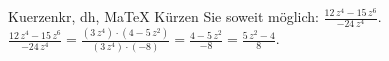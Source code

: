 \begin{MAufgabe}{Kuerzen}{kr, dh, MaTeX}
K\"urzen Sie soweit m\"oglich: $\frac{12\, z^4 - 15\, z^6}{- 24\, z^4}$.\\ 
\ifLsg\MLoesung
\quad $\frac{12\, z^4 - 15\, z^6}{- 24\, z^4}=\frac{(3\, z^4)\cdot(4 - 5\, z^2)}{(3\, z^4)\cdot(-8)}=\frac{4 - 5\, z^2}{-8}=\frac{5\, z^2 - 4}{8}$.\else\relax\fi
 \end{MAufgabe}